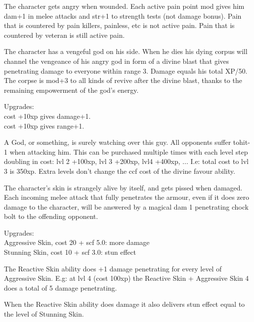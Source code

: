  The character gets angry when wounded. Each active pain point mod gives him dam+1 in melee attacks and str+1 to strength tests (not damage bonus). Pain that is countered by pain killers, painless, etc is not active pain. Pain that is countered by veteran is still active pain.


 The character has a vengeful god on his side. When he dies his dying corpus will channel the vengeance of his angry god in form of a divine blast that gives penetrating damage to everyone within range 3. Damage equals his total XP/50. The corpse is mod+3 to all kinds of revive after the divine blast, thanks to the remaining empowerment of the god's energy.

Upgrades: \\
cost +10xp gives damage+1. \\
cost +10xp gives range+1.


 A God, or something, is surely watching over this guy. All opponents suffer tohit-1 when attacking him. This can be purchased multiple times with each level step doubling in cost: lvl 2 +100xp, lvl 3 +200xp, lvl4 +400xp, ... I.e: total cost to lvl 3 is 350xp. Extra levels don't change the ccf cost of the divine favour ability.


 The character's skin is strangely alive by itself, and gets pissed when damaged. Each incoming melee attack that fully penetrates the armour, even if it does zero damage to the character, will be answered by a magical dam 1 penetrating chock bolt to the offending opponent.

Upgrades: \\
Aggressive Skin, cost 20 + scf 5.0: more damage\\
Stunning Skin, cost 10 + scf 3.0: stun effect

 The Reactive Skin ability does +1 damage penetrating for every level of Aggressive Skin. E.g: at lvl 4 (cost 100xp) the Reactive Skin + Aggressive Skin 4 does a total of 5 damage penetrating.

 When the Reactive Skin ability does damage it also delivers stun effect equal to the level of Stunning Skin.


